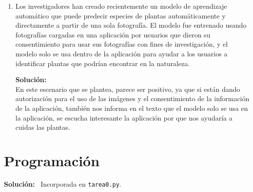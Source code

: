\documentclass[11pt,letterpaper]{article}
\newenvironment{solution}{%
  \noindent\begin{shaded}
  \textbf{Solución:}\ }{
  \end{shaded}%
}
\begin{document}
\begin{enumerate}
\begin{solution}
  \end{solution}
  
\item%
  Los investigadores han creado recientemente un modelo de aprendizaje
  automático que puede predecir especies de plantas automáticamente y
  directamente a partir de una sola fotografía.  El modelo fue
  entrenado usando fotografías cargadas en una aplicación por usuarios
  que dieron su consentimiento para usar sus fotografías con fines de
  investigación, y el modelo solo se usa dentro de la aplicación para
  ayudar a los usuarios a identificar plantas que podrían encontrar en
  la naturaleza.
  \begin{solution}
    \\ En este escenario que se plantea, parece ser positivo, ya que si están dando autorización para el uso de las imágenes y el consentimiento de la información de la aplicación, también nos informa en el texto que el modelo solo se usa en la aplicación, se escucha interesante la aplicación por que nos ayudaría a cuidas las plantas.

  \end{solution}
\end{enumerate}



\section*{Programación}

\begin{solution}
  Incorporada en \texttt{tarea0.py}.
\end{solution}
\end{document}
